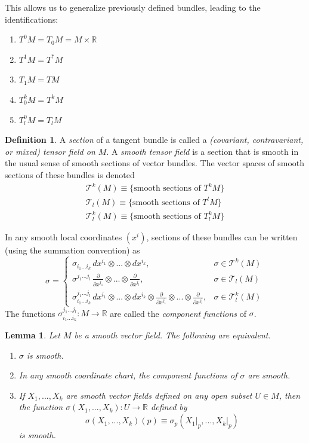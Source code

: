 \documentclass{article}
\newtheorem{lemma}[theorem]{Lemma}
\theoremstyle{remark}
\theoremstyle{definition}
\newtheorem{definition}{Definition}[section]
\begin{document}
    This allows us to generalize previously defined bundles, leading to the identifications: 
    \begin{enumerate}
        \item $T^0 M = T_0 M = M \times \mathbb{R}$
        \item $T^1 M = T^* M$
        \item $T_1 M = T M$
        \item $T^k_0 M = T^k M$
        \item $T^0_l M = T_l M$
    \end{enumerate}

    \begin{definition}
    A \textit{section} of a tangent bundle is called a \textit{(covariant, contravariant, or mixed) tensor field on $M$}. A \textit{smooth tensor field} is a section that is smooth in the usual sense of smooth sections of vector bundles. The vector spaces of smooth sections of these bundles is denoted
    \begin{align*}
        \mathcal{T}^k (M) \equiv \{\text{smooth sections of } T^k M \} \\
        \mathcal{T}_l (M) \equiv \{\text{smooth sections of } T^l M \} \\
        \mathcal{T}^k_l (M) \equiv \{\text{smooth sections of } T^k_l M \}
    \end{align*}
    \end{definition}

    In any smooth local coordinates $(x^i)$, sections of these bundles can be written (using the summation convention) as
    \[\sigma = \begin{cases}
          \sigma_{i_1 ... i_k} \, dx^{i_1} \otimes ... \otimes dx^{i_k}, & \sigma \in \mathcal{T}^k (M) \\
          \sigma^{j_1 ... j_l} \, \frac{\partial}{\partial x^{j_1}} \otimes ... \otimes \frac{\partial}{\partial x^{j_l}}, & \sigma \in \mathcal{T}_l (M) \\
          \sigma_{i_1 ... i_k}^{j_1 ... j_l} \, dx^{i_1} \otimes ... \otimes dx^{i_k} \otimes \frac{\partial}{\partial x^{j_1}} \otimes ... \otimes \frac{\partial}{\partial x^{j_l}}, & \sigma \in \mathcal{T}^k_l (M)
    \end{cases}\]
    The functions $\sigma_{i_1 ... i_k}^{j_1 ... j_l} : M \longrightarrow \mathbb{R}$ are called the \textit{component functions} of $\sigma$. 

    \begin{lemma}
    Let $M$ be a smooth vector field. The following are equivalent.
    \begin{enumerate}
        \item $\sigma$ is smooth. 
        \item In any smooth coordinate chart, the component functions of $\sigma$ are smooth. 
        \item If $X_1, ..., X_k$ are smooth vector fields defined on any open subset $U \in M$, then the function $\sigma(X_1, ..., X_k): U \longrightarrow \mathbb{R}$ defined by 
        \[\sigma(X_1, ..., X_k) (p) \equiv \sigma_p (X_1 \big|_p, ..., X_k \big|_p)\]
        is smooth. 
    \end{enumerate}
    \end{lemma}
\end{document}
